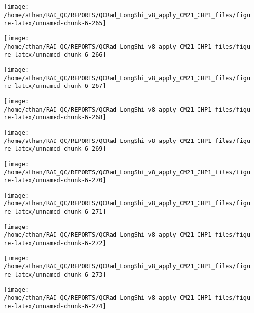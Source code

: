 \documentclass[
  10pt,
  a4paper,oneside]{article}
\begin{document}
\begin{center}\texttt{[image: /home/athan/RAD\_QC/REPORTS/QCRad\_LongShi\_v8\_apply\_CM21\_CHP1\_files/figure-latex/unnamed-chunk-6-265]} \end{center}

\begin{center}\texttt{[image: /home/athan/RAD\_QC/REPORTS/QCRad\_LongShi\_v8\_apply\_CM21\_CHP1\_files/figure-latex/unnamed-chunk-6-266]} \end{center}

\begin{center}\texttt{[image: /home/athan/RAD\_QC/REPORTS/QCRad\_LongShi\_v8\_apply\_CM21\_CHP1\_files/figure-latex/unnamed-chunk-6-267]} \end{center}

\begin{center}\texttt{[image: /home/athan/RAD\_QC/REPORTS/QCRad\_LongShi\_v8\_apply\_CM21\_CHP1\_files/figure-latex/unnamed-chunk-6-268]} \end{center}

\begin{center}\texttt{[image: /home/athan/RAD\_QC/REPORTS/QCRad\_LongShi\_v8\_apply\_CM21\_CHP1\_files/figure-latex/unnamed-chunk-6-269]} \end{center}

\begin{center}\texttt{[image: /home/athan/RAD\_QC/REPORTS/QCRad\_LongShi\_v8\_apply\_CM21\_CHP1\_files/figure-latex/unnamed-chunk-6-270]} \end{center}

\begin{center}\texttt{[image: /home/athan/RAD\_QC/REPORTS/QCRad\_LongShi\_v8\_apply\_CM21\_CHP1\_files/figure-latex/unnamed-chunk-6-271]} \end{center}

\begin{center}\texttt{[image: /home/athan/RAD\_QC/REPORTS/QCRad\_LongShi\_v8\_apply\_CM21\_CHP1\_files/figure-latex/unnamed-chunk-6-272]} \end{center}

\begin{center}\texttt{[image: /home/athan/RAD\_QC/REPORTS/QCRad\_LongShi\_v8\_apply\_CM21\_CHP1\_files/figure-latex/unnamed-chunk-6-273]} \end{center}

\begin{center}\texttt{[image: /home/athan/RAD\_QC/REPORTS/QCRad\_LongShi\_v8\_apply\_CM21\_CHP1\_files/figure-latex/unnamed-chunk-6-274]} \end{center}
\end{document}
